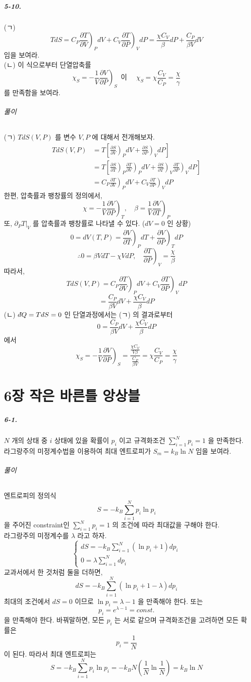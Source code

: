 \documentclass[a4paper,12pt]{report}
\newcommand{\Maxwell}[3][]{\left.\frac{\partial #2}{\partial #3} \right)_{#1} }
\newcommand{\dbar}{d\hspace*{-0.08em}\bar{}\hspace*{0.1em}}
\begin{document}
	\paragraph{5-10. } (ㄱ)
	$$TdS=C_P\Maxwell[P]{T}{V}dV+C_V\Maxwell[V]{T}{P}dP=\frac{\chi C_V}{\beta}dP+\frac{C_P}{\beta V}dV$$
	임을 보여라.\\
	(ㄴ) 이 식으로부터 단열압축률 $$\chi_S=-\frac{1}{V}\Maxwell[S]{V}{P}\,\mbox{ 이 }\quad \chi_S=\chi\frac{C_V}{C_P}=\frac{\chi}{\gamma}$$ 를 만족함을 보여라.
	\subparagraph{풀이} (ㄱ) $TdS(V,P)$ 를 변수 $V,P$ 에 대해서 전개해보자.
	\begin{equation*}
		\begin{split}
			TdS(V,P)&=T\left[\Maxwell[P]{S}{V}dV+\Maxwell[V]{S}{P}dP \right]\\
			&=T\left[\Maxwell[P]{S}{T}\Maxwell[P]{T}{V}dV+\Maxwell[V]{S}{T}\Maxwell[V]{T}{P}dP \right]\\
			&=C_P\Maxwell[P]{T}{V}dV+C_V\Maxwell[V]{T}{P}dP
		\end{split}
	\end{equation*}
	한편, 압축률과 팽창률의 정의에서,
	$$\chi=-\frac{1}{V}\Maxwell[T]{V}{P},\quad \beta=\frac{1}{V}\Maxwell[P]{V}{T}$$
	또, $\partial_PT|_V$ 를 압축률과 팽창률로 나타낼 수 있다. ($dV=0$ 인 상황)
	$$0=dV(T,P)=\Maxwell[P]{V}{T}dT+\Maxwell[T]{V}{P}dP$$
	$$\therefore0=\beta VdT-\chi VdP,\quad \Maxwell[V]{T}{P}=\frac{\chi}{\beta}$$
	따라서,
	$$TdS(V,P)=C_P\Maxwell[P]{T}{V}dV+C_V\Maxwell[V]{T}{P}dP$$
	$$=\frac{C_P}{\beta V}dV+\frac{\chi C_V}{\beta}dP$$
	(ㄴ) $\dbar Q=TdS=0$ 인 단열과정에서는 (ㄱ) 의 결과로부터
	$$0=\frac{C_P}{\beta V}dV+\frac{\chi C_V}{\beta}dP $$
	에서
	$$\chi_S=-\frac{1}{V}\Maxwell[S]{V}{P}=\frac{\frac{\chi C_V}{V\beta}}{\frac{C_P}{\beta V}}=\chi\frac{C_V}{C_P}=\frac{\chi}{\gamma}$$
	\chapter*{6장 작은 바른틀 앙상블}
	\paragraph{6-1. } $N$ 개의 상태 중 $i$ 상태에 있을 확률이 $p_i$ 이고 규격화조건 $\sum_{i=1}^{N}p_i=1$ 을 만족한다. 라그랑주의 미정계수법을 이용하여 최대 엔트로피가 $S_m=k_B\ln N$ 임을 보여라.
	\subparagraph{풀이} 엔트로피의 정의식 
	$$S=-k_B\sum_{i=1}^{N}p_i\ln{p_i}$$
	을 주어진 constraint인 $\sum_{i=1}^{N}p_i=1$ 의 조건에 따라 최대값을 구해야 한다.\\
	라그랑주의 미정계수를 $\lambda$ 라고 하자.
	$$\begin{cases}
	dS=-k_B\sum_{i=1}^{N}(\ln{p_i}+1)dp_i\\
	0=\lambda\sum_{i=1}^{N}dp_i
	\end{cases}$$
	교과서에서 한 것처럼 둘을 더하면,
	$$dS=-k_B\sum_{i=1}^{N}(\ln p_i+1-\lambda)dp_i$$
	최대의 조건에서 $dS=0$ 이므로 $\ln p_i=\lambda-1$ 을 만족해야 한다. 또는
	$$p_i=e^{\lambda-1}=const.$$
	을 만족해야 한다. 바꿔말하면, 모든 $p_i$ 는 서로 같으며 규격화조건을 고려하면 모든 확률은 
	$$p_i=\frac{1}{N}$$
	이 된다. 따라서 최대 엔트로피는 
	$$S=-k_B\sum_{i=1}^{N}p_i\ln{p_i}=-k_BN\left(\frac{1}{N}\ln\frac{1}{N}\right)=k_B\ln N$$
\end{document}
